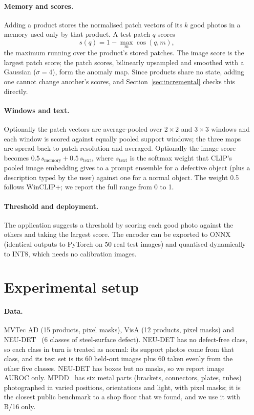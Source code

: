 \documentclass[10pt,twocolumn]{article}
\begin{document}
\paragraph{Memory and scores.} Adding a product stores the normalised patch
vectors of its $k$ good photos in a memory used only by that product. A test
patch $q$ scores
\begin{equation}
s(q) = 1 - \max_{m} \cos(q, m),
\end{equation}
the maximum running over the product's stored patches. The image score is the
largest patch score; the patch scores, bilinearly upsampled and smoothed with a
Gaussian ($\sigma = 4$), form the anomaly map. Since products share no state,
adding one cannot change another's scores, and Section~\ref{sec:incremental}
checks this directly.

\paragraph{Windows and text.} Optionally the patch vectors are average-pooled over
$2\times2$ and $3\times3$ windows and each window is scored against equally pooled
support windows; the three maps are spread back to patch resolution and averaged.
Optionally the image score becomes $0.5\,s_\text{memory} + 0.5\,s_\text{text}$,
where $s_\text{text}$ is the softmax weight that CLIP's pooled image embedding
gives to a prompt ensemble for a defective object (plus a description typed by the
user) against one for a normal object. The weight 0.5 follows WinCLIP+; we report
the full range from 0 to 1.

\paragraph{Threshold and deployment.} The application suggests a threshold by
scoring each good photo against the others and taking the largest score. The
encoder can be exported to ONNX (identical outputs to PyTorch on 50 real test
images) and quantised dynamically to INT8, which needs no calibration images.

\section{Experimental setup}

\paragraph{Data.} MVTec AD (15 products, pixel masks), VisA (12 products, pixel
masks) and NEU-DET~\cite{song2013neu} (6 classes of steel-surface defect). NEU-DET
has no defect-free class, so each class in turn is treated as normal: its support
photos come from that class, and its test set is its 60 held-out images plus 60
taken evenly from the other five classes. NEU-DET has boxes but no masks, so we
report image AUROC only. MPDD~\cite{jezek2021mpdd} has six metal parts (brackets,
connectors, plates, tubes) photographed in varied positions, orientations and
light, with pixel masks; it is the closest public benchmark to a shop floor that
we found, and we use it with B/16 only.
\end{document}
